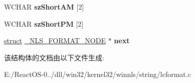 \begin{DoxyCompactItemize}
W\+C\+H\+AR {\bfseries sz\+Short\+AM} \mbox{[}2\mbox{]}
\item 
\mbox{\label{struct___n_l_s___f_o_r_m_a_t___n_o_d_e_afc560f8053fbb509c0bcebd34d9773e4}} 
W\+C\+H\+AR {\bfseries sz\+Short\+PM} \mbox{[}2\mbox{]}
\item 
\mbox{\label{struct___n_l_s___f_o_r_m_a_t___n_o_d_e_a33c43277673b05b2e436955681543e33}} 
\hyperlink{interfacestruct}{struct} \hyperlink{struct___n_l_s___f_o_r_m_a_t___n_o_d_e}{\+\_\+\+N\+L\+S\+\_\+\+F\+O\+R\+M\+A\+T\+\_\+\+N\+O\+DE} $\ast$ {\bfseries next}
\end{DoxyCompactItemize}


该结构体的文档由以下文件生成\+:\begin{DoxyCompactItemize}
\item 
E\+:/\+React\+O\+S-\/0../dll/win32/kernel32/winnls/string/lcformat.\+c\end{DoxyCompactItemize}
